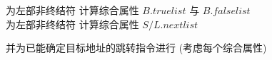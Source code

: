 \begin{frame}{}
  \begin{center}
    为左部非终结符  计算综合属性 $B.\mathit{truelist}$ 与 $B.\mathit{falselist}$ \\[5pt]
    为左部非终结符  计算综合属性 $S/L.\mathit{nextlist}$


    并为已能确定目标地址的跳转指令进行 (考虑每个综合属性)
  \end{center}
\end{frame}
